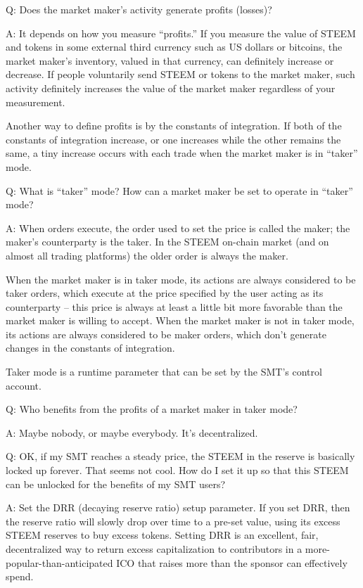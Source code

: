\documentclass{article}
\begin{document}
Q:  Does the market maker's activity generate profits (losses)?

A:  It depends on how you measure ``profits.'' If you measure the value of STEEM
and tokens in some external third currency such as US dollars or bitcoins, the
market maker's inventory, valued in that currency, can definitely increase or
decrease.  If people voluntarily send STEEM or tokens to the market maker,
such activity definitely increases the value of the market maker regardless of
your measurement.

Another way to define profits is by the constants of integration.  If both
of the constants of integration increase, or one increases while the other
remains the same, a tiny increase occurs with each trade when the market
maker is in ``taker'' mode.

Q:  What is ``taker'' mode?  How can a market maker be set to operate
in ``taker'' mode?

A:  When orders execute, the order used to set the price is called the maker;
the maker's counterparty is the taker.  In the STEEM on-chain market (and on
almost all trading platforms) the older order is always the maker.

When the market maker is in taker mode, its actions are always considered to be
taker orders, which execute at the price specified by the user acting as its
counterparty -- this price is always at least a little bit more favorable than
the market maker is willing to accept.  When the market maker is not in taker
mode, its actions are always considered to be maker orders, which don't
generate changes in the constants of integration.

Taker mode is a runtime parameter that can be set by the SMT's control account.

Q:  Who benefits from the profits of a market maker in taker mode?

A:  Maybe nobody, or maybe everybody.  It's decentralized.

Q:  OK, if my SMT reaches a steady price, the STEEM in the reserve is basically
locked up forever.  That seems not cool.  How do I set it up so that this STEEM
can be unlocked for the benefits of my SMT users?

A:  Set the DRR (decaying reserve ratio) setup parameter.  If you set DRR, then the
reserve ratio will slowly drop over time to a pre-set value, using its excess STEEM
reserves to buy excess tokens.  Setting DRR is an excellent, fair, decentralized
way to return excess capitalization to contributors in a more-popular-than-anticipated
ICO that raises more than the sponsor can effectively spend.
\end{document}
